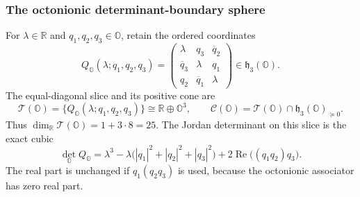 \subsubsection{The octonionic determinant-boundary sphere}

For \(\lambda\in\mathbb R\) and \(q_1,q_2,q_3\in\mathbb O\), retain the ordered
coordinates
\begin{equation}
 Q_{\mathbb O}(\lambda;q_1,q_2,q_3)=
 \begin{pmatrix}
 \lambda&q_3&\overline q_2\\
 \overline q_3&\lambda&q_1\\
 q_2&\overline q_1&\lambda
 \end{pmatrix}
 \in\mathfrak h_3(\mathbb O).
 \label{h24:eq:octonionic-equal-diagonal}
\end{equation}
The equal-diagonal slice and its positive cone are
\begin{equation}
 \mathcal T(\mathbb O)=
 \{Q_{\mathbb O}(\lambda;q_1,q_2,q_3)\}
 \cong\mathbb R\oplus\mathbb O^3,\qquad
 \mathcal C(\mathbb O)=\mathcal T(\mathbb O)\cap
                 \mathfrak h_3(\mathbb O)_{\succeq0}.
 \label{h24:eq:octonionic-equal-diagonal-cone}
\end{equation}
Thus \(\dim_{\mathbb R}\mathcal T(\mathbb O)=1+3\cdot8=25\).  The Jordan determinant
on this slice is the exact cubic
\begin{equation}
 \det_{\mathbb O}Q_{\mathbb O}
 =\lambda^3-\lambda\bigl(
 |q_1|^2+|q_2|^2+|q_3|^2\bigr)
 +2\operatorname{Re}\bigl((q_1q_2)q_3\bigr).
 \label{h24:eq:octonionic-equal-diagonal-determinant}
\end{equation}
The real part is unchanged if \(q_1(q_2q_3)\) is used, because the
octonionic associator has zero real part.


